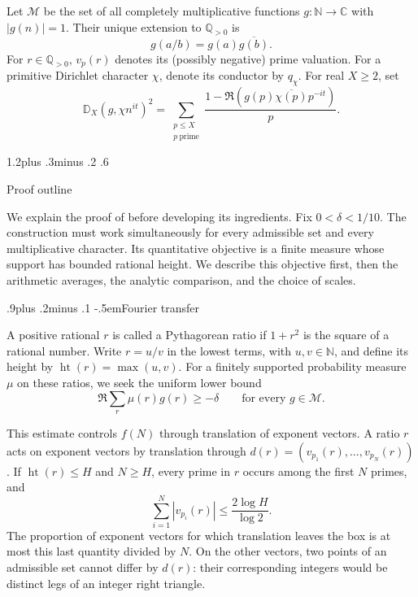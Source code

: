\documentclass[twoside]{aomart}
\makeatletter
\theoremstyle{paperplain}
\theoremstyle{paperdefinition}
\renewcommand\section{\@startsection{section}{1}{\z@}
  {1.2\baselineskip plus .3\baselineskip minus .2\baselineskip}
  {.6\baselineskip}{\normalfont\large\bfseries\raggedright}}
\renewcommand\subsection{\@startsection{subsection}{2}{\z@}
  {.9\baselineskip plus .2\baselineskip minus .1\baselineskip}
  {-.5em}{\normalfont\bfseries}}
\newcommand{\N}{\mathbb N}
\newcommand{\Q}{\mathbb Q}
\newcommand{\C}{\mathbb C}
\numberwithin{equation}{section}
\makeatother
\begin{document}
Let $\mathcal M$ be the set of all completely multiplicative functions
$g:\N\to\C$ with $|g(n)|=1$.  Their unique extension to
$\Q_{>0}$ is
\begin{equation}
 g(a/b)=g(a)\overline{g(b)}.
 \label{eq:rational-extension}
\end{equation}
For $r\in\Q_{>0}$, $v_p(r)$ denotes its (possibly negative) prime
valuation.  For a primitive Dirichlet character $\chi$,  denote its conductor
by $q_\chi$.  For real $X\ge2$, set
\begin{equation*}
 \mathbb D_X(g,\chi n^{it})^2
 =\sum_{\substack{p\le X\\p\ \mathrm{prime}}}\frac{1-\Re(g(p)\overline{\chi(p)}p^{-it})}{p}.
\end{equation*}

\section{Proof outline}
\label{sec:framework}

We explain the proof of  before developing its
ingredients. Fix $0<\delta<1/10$. The construction must work
simultaneously for every admissible set and every multiplicative
character. Its quantitative objective is a finite measure whose
support has bounded rational height. We describe this objective
first, then the arithmetic averages, the analytic comparison, and
the choice of scales. 

\subsection{Fourier transfer}

A positive rational $r$ is called a Pythagorean ratio if $1+r^2$
is the square of a rational number. Write $r=u/v$ in the lowest terms,
with $u,v\in\N$, and define its height by
$
 \operatorname{ht}(r)=\max(u,v).
$
For a finitely supported probability measure $\mu$ on these ratios,
we seek the uniform lower bound
\begin{equation}
 \Re\sum_r\mu(r)g(r)\ge-\delta
 \qquad\text{for every }g\in\mathcal M.
 \label{fw:measure-objective}
\end{equation}

This estimate controls $f(N)$ through translation of exponent
vectors. A ratio $r$ acts on exponent
vectors by translation through
$d(r)=(v_{p_1}(r),\ldots,v_{p_N}(r))$. If $\operatorname{ht}(r)\le H$
and $N\ge H$, every prime in $r$ occurs among the first $N$ primes,
and
\begin{equation*}
 \sum_{i=1}^N|v_{p_i}(r)|\le\frac{2\log H}{\log2}.
\end{equation*}
The proportion of exponent vectors for which translation leaves
the box is at most this last quantity divided by $N$.
On the other vectors, two points of an admissible set cannot differ
by $d(r)$: their corresponding integers would be distinct legs of
an integer right triangle.
\end{document}
